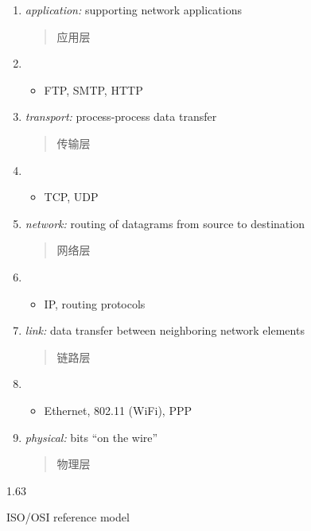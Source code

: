 \documentclass[
]{article}
\begin{document}
\begin{enumerate}
\def\labelenumi{\arabic{enumi}.}
\item
  \emph{application:} supporting network applications

  \begin{quote}
  应用层
  \end{quote}
\item
  \begin{itemize}
  \item
    FTP, SMTP, HTTP
  \end{itemize}
\item
  \emph{transport:} process-process data transfer

  \begin{quote}
  传输层
  \end{quote}
\item
  \begin{itemize}
  \item
    TCP, UDP
  \end{itemize}
\item
  \emph{network:} routing of datagrams from source to destination

  \begin{quote}
  网络层
  \end{quote}
\item
  \begin{itemize}
  \item
    IP, routing protocols
  \end{itemize}
\item
  \emph{link:} data transfer between neighboring network elements

  \begin{quote}
  链路层
  \end{quote}
\item
  \begin{itemize}
  \item
    Ethernet, 802.11 (WiFi), PPP
  \end{itemize}
\item
  \emph{physical:} bits ``on the wire''

  \begin{quote}
  物理层
  \end{quote}
\end{enumerate}

1.63

ISO/OSI reference model
\end{document}
